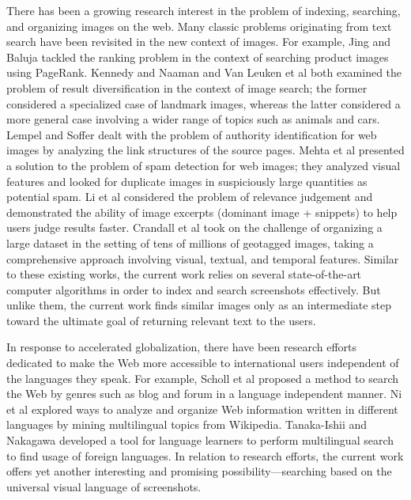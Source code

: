 \documentclass{www2010-submission}
\begin{document}
There has been a growing research interest in the problem of indexing,
searching, and organizing images on the web.  Many classic problems
originating from text search have been revisited in the new context of
images. For example, Jing and Baluja \cite{Jing} tackled the ranking
problem in the context of searching product images using PageRank.
Kennedy and Naaman \cite{Kennedy} and Van Leuken et al
\cite{vanLeuken} both examined the problem of result diversification in
the context of image search; the former considered a specialized case
of landmark images, whereas the latter considered a more general case
involving a wider range of topics such as animals and cars. Lempel and
Soffer \cite{Lempel} dealt with the problem of authority
identification for web images by analyzing the link structures of the
source pages.  Mehta et al \cite{Mehta} presented a solution to the
problem of spam detection for web images; they analyzed visual
features and looked for duplicate images in suspiciously large
quantities as potential spam.  Li et al \cite{Li} considered the
problem of relevance judgement and demonstrated the ability of image
excerpts (dominant image + snippets) to help users judge results
faster. Crandall et al \cite{Crandall} took on the challenge of
organizing a large dataset in the setting of tens of millions of
geotagged images, taking a comprehensive approach involving visual,
textual, and temporal features. Similar to these existing works, the
current work relies on several state-of-the-art computer algorithms in
order to index and search screenshots effectively. But unlike them,
the current work finds similar images only as an intermediate step
toward the ultimate goal of returning relevant text to the users.

In response to accelerated globalization, there have been research
efforts dedicated to make the Web more accessible to international
users independent of the languages they speak. For example, Scholl et
al \cite{Scholl} proposed a method to search the Web by genres such as
blog and forum in a language independent manner. Ni et al \cite{Ni}
explored ways to analyze and organize Web information written in
different languages by mining multilingual topics from
Wikipedia. Tanaka-Ishii and Nakagawa \cite{Tanaka-Ishii} developed a
tool for language learners to perform multilingual search to find
usage of foreign languages. In relation to research efforts,
the current work offers yet another interesting and promising
possibility---searching based on the universal
visual language of screenshots.
\end{document}
